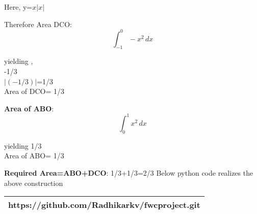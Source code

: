 \documentclass[10pt, a4paper]{article}
\begin{document}
Here, y=$x|x|$

Therefore Area DCO: \[ \int_{-1}^{0} -x^2 \,dx \]

 yielding ,\\
 
   -1/3 \\
 
 $|(-1/3)|$=1/3\\
 
 Area of DCO= 1/3

\textbf{Area  of ABO}: \[ \int_{0}^{1} x^2 \,dx \]

    yielding 1/3\\
   
     
     Area of ABO= 1/3
     

\textbf{Required Area=ABO+DCO}:
  1/3+1/3=2/3
Below python code realizes the above construction 

\begin{table}[h!]
    \begin{tabular}{|c|}
    \hline
         https://github.com/Radhikarkv/fwcproject.git\\
	\hline
    \end{tabular}
\end{table}
\end{document}
